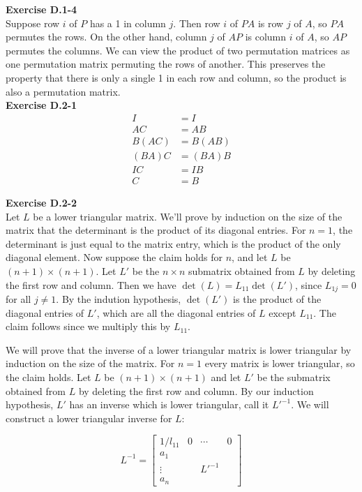 \documentclass{article}
\begin{document}
\noindent\textbf{Exercise D.1-4}\\

Suppose row $i$ of $P$ has a 1 in column $j$.  Then row $i$ of $PA$ is row $j$ of $A$, so $PA$ permutes the rows.  On the other hand, column $j$ of $AP$ is column $i$ of $A$, so $AP$ permutes the columns.  We can view the product of two permutation matrices as one permutation matrix permuting the rows of another.  This preserves the property that there is only a single 1 in each row and column, so the product is also a permutation matrix. \\

\noindent\textbf{Exercise D.2-1}\\

\begin{align*}
I&=I\\
AC&=AB\\
B(AC)&=B(AB)\\
(BA)C&=(BA)B\\
IC&=IB\\
C&=B
\end{align*}

\noindent\textbf{Exercise D.2-2}\\

Let $L$ be a lower triangular matrix.  We'll prove by induction on the size of the matrix that the determinant is the product of its diagonal entries. For $n=1$, the determinant is just equal to the matrix entry, which is the product of the only diagonal element.  Now suppose the claim holds for $n$, and let $L$ be $(n+1) \times (n+1)$.  Let $L'$ be the $n \times n$ submatrix obtained from $L$ by deleting the first row and column.  Then we have $\det(L) = L_{11} \det(L')$, since $L_{1j} = 0$ for all $j \neq 1$.  By the indution hypothesis, $\det(L')$ is the product of the diagonal entries of $L'$, which are all the diagonal entries of $L$ except $L_{11}$.  The claim follows since we multiply this by $L_{11}$.  

We will prove that the inverse of a lower triangular matrix is lower triangular by induction on the size of the matrix.  For $n=1$ every matrix is lower triangular, so the claim holds.  Let $L$ be $(n+1) \times (n+1)$ and let $L'$ be the submatrix obtained from $L$ by deleting the first row and column.  By our induction hypothesis, $L'$ has an inverse which is lower triangular, call it $L'^{-1}$.  We will construct a lower triangular inverse for $L$:

\[ L^{-1} = \left[ \begin{array}{c|ccc} 1/l_{11}& 0&\cdots&0 \\ \hline a_1 &&&\\ \vdots&&L'^{-1}& \\ a_n & && \end{array}\right] \]
\end{document}
